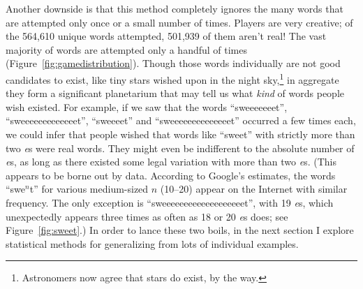 \documentclass[twocolumn]{article}
\begin{document}
Another downside is that this method completely ignores the many words
that are attempted only once or a small number of times. Players are
very creative; of the 564,610 unique words attempted, 501,939 of them
aren't real! The vast majority of words are attempted only a handful
of times (Figure~\ref{fig:gamedistribution}). Though those words
individually are not good candidates to exist, like tiny stars wished
upon in the night sky,\!\footnote{Astronomers now agree that stars do
  exist, by the way.} in aggregate they form a significant planetarium
that may tell us what {\it kind} of words people wish existed. For
example, if we saw that the words ``sweeeeeeet'',
``sweeeeeeeeeeeeet'', ``sweeeet'' and ``sweeeeeeeeeeeeeet'' occurred a
few times each, we could infer that people wished that words like
``sweet'' with strictly more than two {\it e}s were real words. They
might even be indifferent to the absolute number of {\it e}s, as long
as there existed some legal variation with more than two {\it e}s.
(This appears to be borne out by data. According to Google's
estimates, the words ``swe$^n$t'' for various medium-sized $n$
(10--20) appear on the Internet with similar frequency. The only
exception is ``sweeeeeeeeeeeeeeeeeeet'', with 19 {\it e}s, which
unexpectedly appears three times as often as 18 or 20 {\it e}s does;
see Figure~\ref{fig:sweet}.) In order to lance these two boils, in the
next section I explore statistical methods for generalizing from lots
of individual examples.
\end{document}
